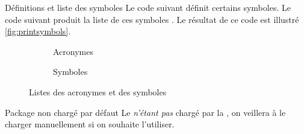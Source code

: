 \begin{dbexample}{Définitions et liste des symboles}{}
  Le code suivant définit certains symboles.
  Le code suivant produit la liste de ces symboles .
   Le résultat de ce
  code est illustré \vref{fig:printsymbols}.
\end{dbexample}

  \begin{landscape}
    \begin{figure}[p]
      \centering
      \begin{subfigure}[b]{.45\linewidth}
        \centering
        \caption{Acronymes}
        \label{fig:printacronyms}
      \end{subfigure}%
      \begin{subfigure}[b]{.45\linewidth}
        \centering
        \caption{Symboles}
        \label{fig:printsymbols}
      \end{subfigure}%
      \caption{Listes des acronymes et des symboles}
      \label{fig:printacronyms-printsymbols}
    \end{figure}
  \end{landscape}

\begin{dbwarning}{Package  non chargé par défaut}{}
  Le  \emph{n'étant pas} chargé par la \yatcl, on veillera
  à le charger manuellement si on souhaite l'utiliser.
\end{dbwarning}


